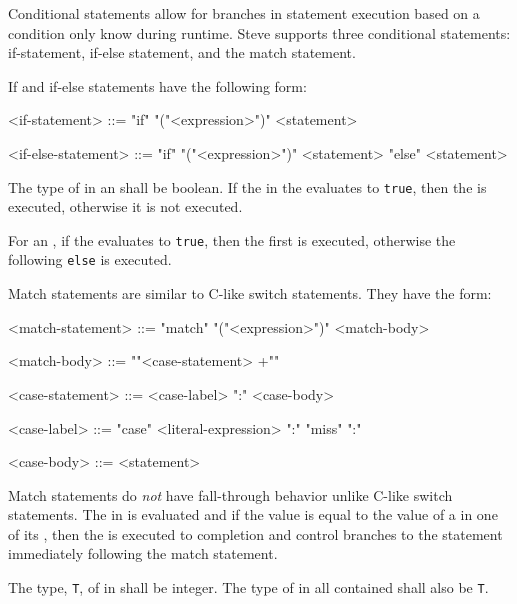 Conditional statements allow for branches in statement execution based on a condition only know during runtime. Steve supports three conditional statements: if-statement, if-else statement, and the match statement.

If and if-else statements have the following form:

\begin{minip}
\begin{grammar}
<if-statement> ::= "if" "("<expression>")" <statement>

<if-else-statement> ::= "if" "("<expression>")" <statement> "else" <statement>
\end{grammar}
\end{minip}

The type of  in an  shall be boolean. If the  in the  evaluates to \texttt{true}, then the  is executed, otherwise it is not executed. 

For an , if the  evaluates to \texttt{true}, then the first  is executed, otherwise the  following \texttt{else} is executed.

Match statements are similar to C-like switch statements. They have the form:

\begin{minip}
\begin{grammar}
<match-statement> ::= "match" "("<expression>")" <match-body>

<match-body> ::= "{"<case-statement> +"}"

<case-statement> ::= <case-label> ":" <case-body>

<case-label> ::= 
"case" <literal-expression> ":"
\alt "miss" ":"

<case-body> ::= <statement> 
\end{grammar}
\end{minip}

Match statements do \textit{not} have fall-through behavior unlike C-like switch statements. The  in  is evaluated and if the value is equal to the value of a  in one of its , then the  is executed to completion and control branches to the statement immediately following the match statement.

The type, \texttt{T}, of  in  shall be integer. The type of  in all contained  shall also be \texttt{T}.

